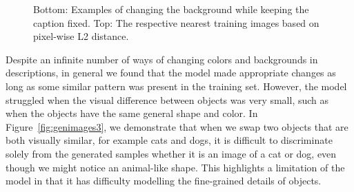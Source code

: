 \documentclass{article} %
\begin{document}
\begin{figure}[!h]
\begin{center}
%
\quad
%
\end{center}
\caption{Bottom: Examples of changing the background while keeping the caption fixed. Top: The respective nearest training images based on pixel-wise L2 distance.}
\label{fig:genimages2}
\vspace{-0.3cm}
\end{figure}

Despite an infinite number of ways of changing colors and backgrounds in descriptions, in general we found that the model made appropriate changes as long as some similar pattern was present in the training set. However, the model struggled when the visual difference between objects was very small, such as when the objects have the same general shape and color. In Figure~\ref{fig:genimages3}, we demonstrate that when we swap two objects that are both visually similar, for example cats and dogs, it is difficult to discriminate solely from the generated samples whether it is an image of a cat or dog, even though we might notice an animal-like shape. This highlights a limitation of the model in that it has difficulty modelling the fine-grained details of objects. 
 
\end{document}
